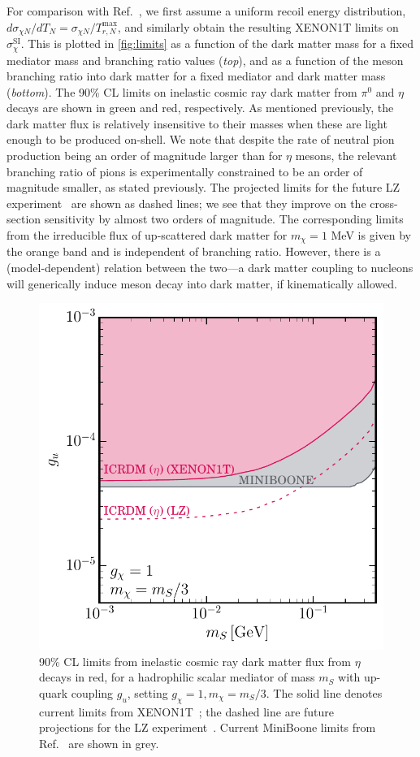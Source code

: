 \documentclass[prl,twocolumn,groupedaddress,nofootinbib, superscriptaddress]{revtex4-1}
\begin{document}
For comparison with Ref.~\cite{Bringmann:2018cvk}, we first assume a uniform recoil energy distribution, $d\sigma_{\chi N}/dT_N = \sigma_{\chi N} / T_{r,N}^\text{max}$, and similarly obtain the resulting XENON1T limits on $\sigma_\chi^\text{SI}$. This is plotted in \cref{fig:limits} as a function of the dark matter mass for a fixed mediator mass and branching ratio values (\textit{top}), and as a function of the meson branching ratio into dark matter for a fixed mediator and dark matter mass (\textit{bottom}). The 90\% CL limits on inelastic cosmic ray dark matter from $\pi^0$ and $\eta$ decays are shown in green and red, respectively. As mentioned previously, the dark matter flux is relatively insensitive to their masses when these are light enough to be produced on-shell. We note that despite the rate of neutral pion production being an order of magnitude larger than for $\eta$ mesons, the relevant branching ratio of pions is experimentally constrained to be an order of magnitude smaller, as stated previously. The projected limits for the future LZ experiment~\cite{Akerib:2018lyp} are shown as dashed lines; we see that they improve on the cross-section sensitivity by almost two orders of magnitude. The corresponding limits from the irreducible flux of up-scattered dark matter for $m_\chi = 1$ MeV is given by the orange band and is independent of branching ratio. However, there is a (model-dependent) relation between the two---a dark matter coupling to nucleons will generically induce meson decay into dark matter, if kinematically allowed.

\begin{figure}
\begin{center}
\includegraphics[width=0.45 \textwidth]{hadrophilic_no_title.pdf}
\end{center}
\caption{90\% CL limits from inelastic cosmic ray dark matter flux from $\eta$ decays in red, for a hadrophilic scalar mediator of mass $m_S$ with up-quark coupling $g_u$, setting $g_\chi=1, m_\chi = m_S/3$. The solid line denotes current limits from XENON1T~\cite{Aprile:2018dbl}; the dashed line are future projections for the LZ experiment~\cite{Akerib:2018lyp}. Current MiniBoone limits from Ref.~\cite{Aguilar-Arevalo:2018wea} are shown in grey.
\label{fig:hadrophilic}}
\end{figure}
\end{document}
